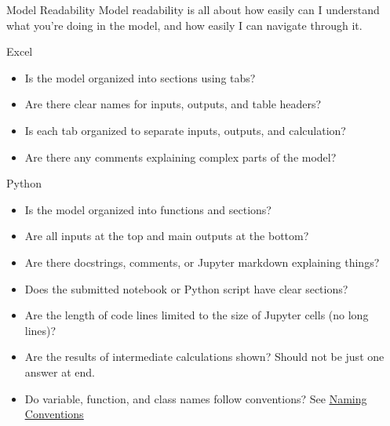 \documentclass[]{article}
\begin{document}
\begin{section}{Model Readability}
Model readability is all about how easily can I understand what you're doing in the model, and how easily I can navigate through it.
\begin{subsection}{Excel}
\begin{itemize}
\item Is the model organized into sections using tabs?
\item Are there clear names for inputs, outputs, and table headers?
\item Is each tab organized to separate inputs, outputs, and calculation?
\item Are there any comments explaining complex parts of the model?
\end{itemize}
\end{subsection}
\begin{subsection}{Python}
\begin{itemize}
\item Is the model organized into functions and sections?
\item Are all inputs at the top and main outputs at the bottom?
\item Are there docstrings, comments, or Jupyter markdown explaining things?
\item Does the submitted notebook or Python script have clear sections?
\item Are the length of code lines limited to the size of Jupyter cells (no long lines)?
\item Are the results of intermediate calculations shown? Should not be just one answer at end.
\item Do variable, function, and class names follow conventions? See
\textcolor{blue}{\underline{\href{https://realpython.com/python-pep8/\#naming-conventions}{Naming Conventions}}}
\end{itemize}
\end{subsection}
\end{section}
\end{document}
